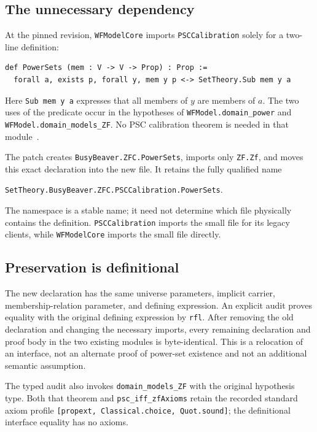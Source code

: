 \documentclass[11pt]{article}
\begin{document}
\subsection{The unnecessary dependency}

At the pinned revision, \texttt{WFModelCore} imports \texttt{PSCCalibration} solely for a two-line definition:
\begin{lstlisting}
def PowerSets (mem : V -> V -> Prop) : Prop :=
  forall a, exists p, forall y, mem y p <-> SetTheory.Sub mem y a
\end{lstlisting}
Here \texttt{Sub mem y a} expresses that all members of $y$ are members of $a$. The two uses of the predicate occur in the hypotheses of \texttt{WFModel.domain\_power} and \texttt{WFModel.domain\_models\_ZF}. No PSC calibration theorem is needed in that module~\cite{wfcore,psc}.

The patch creates \texttt{BusyBeaver.ZFC.PowerSets}, imports only \texttt{ZF.Zf}, and moves this exact declaration into the new file. It retains the fully qualified name
\begin{center}\texttt{SetTheory.BusyBeaver.ZFC.PSCCalibration.PowerSets}.
\end{center}
The namespace is a stable name; it need not determine which file physically contains the definition. \texttt{PSCCalibration} imports the small file for its legacy clients, while \texttt{WFModelCore} imports the small file directly.

\subsection{Preservation is definitional}

The new declaration has the same universe parameters, implicit carrier, membership-relation parameter, and defining expression. An explicit audit proves equality with the original defining expression by \texttt{rfl}. After removing the old declaration and changing the necessary imports, every remaining declaration and proof body in the two existing modules is byte-identical. This is a relocation of an interface, not an alternate proof of power-set existence and not an additional semantic assumption.

The typed audit also invokes \texttt{domain\_models\_ZF} with the original hypothesis type. Both that theorem and \texttt{psc\_iff\_zfAxioms} retain the recorded standard axiom profile \texttt{[propext, Classical.choice, Quot.sound]}; the definitional interface equality has no axioms.
\end{document}
